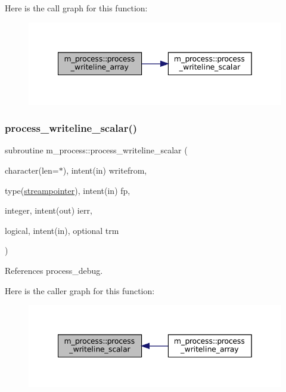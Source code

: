 Here is the call graph for this function\+:
\nopagebreak
\begin{figure}[H]
\begin{center}
\leavevmode
\includegraphics[width=342pt]{namespacem__process_a08887a918eba167ceacddf58ca084270_cgraph}
\end{center}
\end{figure}
\mbox{\label{namespacem__process_a72527c0ec0af26dcb14b8bfad6dcd482}} 
\subsubsection{\texorpdfstring{process\+\_\+writeline\+\_\+scalar()}{process\_writeline\_scalar()}}
{\footnotesize\ttfamily subroutine m\+\_\+process\+::process\+\_\+writeline\+\_\+scalar (\begin{DoxyParamCaption}\item[{character(len=$\ast$), intent(in)}]{writefrom,  }\item[{type(\mbox{\hyperlink{structm__process_1_1streampointer}{streampointer}}), intent(in)}]{fp,  }\item[{integer, intent(out)}]{ierr,  }\item[{logical, intent(in), optional}]{trm }\end{DoxyParamCaption})\hspace{0.3cm}{\ttfamily [private]}}



References process\+\_\+debug.

Here is the caller graph for this function\+:
\nopagebreak
\begin{figure}[H]
\begin{center}
\leavevmode
\includegraphics[width=342pt]{namespacem__process_a72527c0ec0af26dcb14b8bfad6dcd482_icgraph}
\end{center}
\end{figure}


